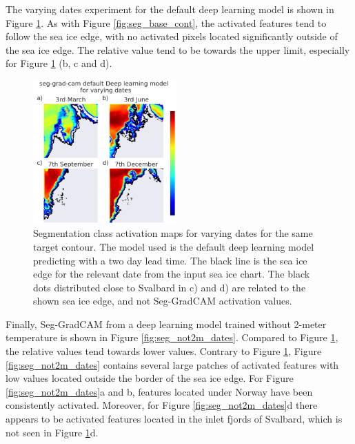 \documentclass[../main/thesis.tex]{subfiles}
\begin{document}
The varying dates experiment for the default deep learning model is shown in Figure \ref{fig:seg_base_dates}. As with Figure \ref{fig:seg_base_cont}, the activated features tend to follow the sea ice edge, with no activated pixels located significantly outside of the sea ice edge. The relative value tend to be towards the upper limit, especially for Figure \ref{fig:seg_base_dates} (b, c and d).

\begin{figure}
    \centering
    \includegraphics[width=0.49\textwidth]{baseline_dates}
    \caption{\label{fig:seg_base_dates}Segmentation class activation maps for varying dates for the same target contour. The model used is the default deep learning model predicting with a two day lead time. The black line is the sea ice edge for the relevant date from the input sea ice chart. The black dots distributed close to Svalbard in c) and d) are related to the shown sea ice edge, and not Seg-GradCAM activation values.}
\end{figure}

Finally, Seg-GradCAM from a deep learning model trained without 2-meter temperature is shown in Figure \ref{fig:seg_not2m_dates}. Compared to Figure \ref{fig:seg_base_dates}, the relative values tend towards lower values. Contrary to Figure \ref{fig:seg_base_dates}, Figure \ref{fig:seg_not2m_dates} contains several large patches of activated features with low values located outside the border of the sea ice edge. For Figure \ref{fig:seg_not2m_dates}a and b, features located under Norway have been consistently activated. Moreover, for Figure \ref{fig:seg_not2m_dates}d there appears to be activated features located in the inlet fjords of Svalbard, which is not seen in Figure \ref{fig:seg_base_dates}d.
\end{document}

